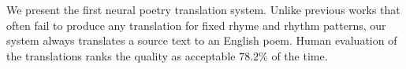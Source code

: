 We present the first neural poetry translation system. Unlike previous works that often fail to produce any translation for fixed rhyme and rhythm patterns, our system always translates a source text to an English poem. Human evaluation of the translations ranks the quality as acceptable $78.2\%$ of the time.
